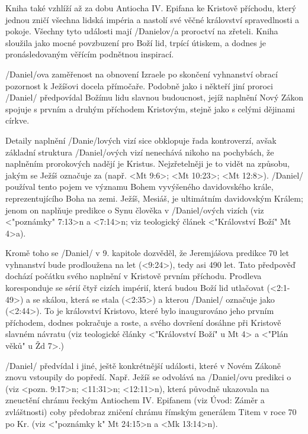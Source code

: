 Kniha také vzhlíží až za dobu Antiocha IV. Epifana ke Kristově příchodu, který jednou zničí všechna lidská impéria a nastolí své věčné království spravedlnosti a pokoje. Všechny tyto události mají \x/Danielov/a proroctví na zřeteli.
Kniha sloužila jako mocné povzbuzení pro Boží lid, trpící útiskem, a dodnes je pronásledovaným věřícím podnětnou inspirací. 


\x/Daniel/ova zaměřenost na obnovení Izraele po skončení vyhnanství obrací pozornost k Ježíšovi docela přímočaře.
Podobně jako i někteří jiní proroci \x/Daniel/ předpovídal Božímu lidu slavnou budoucnost, jejíž naplnění Nový Zákon 
spojuje s prvním a druhým příchodem Kristovým, stejně jako s celými dějinami církve.

Detaily naplnění \x/Danie/lových vizí sice obklopuje řada kontroverzí, avšak základní struktura \x/Daniel/ových vizí nenechává nikoho na pochybách, že naplněním prorokových nadějí je Kristus.
Nejzřetelněji je to vidět na způsobu, jakým se Ježíš označuje za  (např. <Mt 9:6>; <Mt 10:23>; <Mt 12:8>).
\x/Daniel/ používal tento pojem ve významu Bohem vyvýšeného davidovského krále, reprezentujícího Boha na zemi.
Ježíš, Mesiáš, je ultimátním davidovským Králem; jenom on naplňuje predikce o Synu člověka v \x/Daniel/ových vizích (viz <"poznámky" 7:13>n a <7:14>n; viz teologický článek 
<"Království Boží"  Mt 4>a). 

Kromě toho se \x/Daniel/ v 9. kapitole dozvěděl, že Jeremjášova predikce 70 let vyhnanství bude prodloužena 
na  let (<9:24>), tedy asi 490 let.
Tato předpověď dochází počátku svého naplnění v Kristově prvním příchodu. Prodleva koresponduje se sérií čtyř cizích impérií, která budou Boží lid utlačovat (<2:1-49>) a se skálou, která se stala  (<2:35>) a kterou \x/Daniel/ označuje jako  (<2:44>). 
To je království Kristovo, které bylo inaugurováno jeho prvním příchodem, dodnes pokračuje a roste, a svého dovršení dosáhne při Kristově slavném návratu (viz teologické články <"Království Boží" u Mt 4> a <"Plán věků" u Žd 7>.)

\x/Daniel/ předvídal i jiné, ještě konkrétnější události, které v Novém Zákoně znovu vstoupily do popředí.
Např. Ježíš  se odvolává na \x/Daniel/ovu predikci o  (viz <pozn. 9:17>n; <11:31>n; <12:11>n),
která původně ukazovala na zneuctění chrámu řeckým Antiochem IV. Epifanem (viz Úvod: Záměr a zvláštnosti) coby předobraz zničení chrámu  římským generálem Titem v roce 70 po Kr. (viz <"poznámky k" Mt 24:15>n a <Mk 13:14>n).

